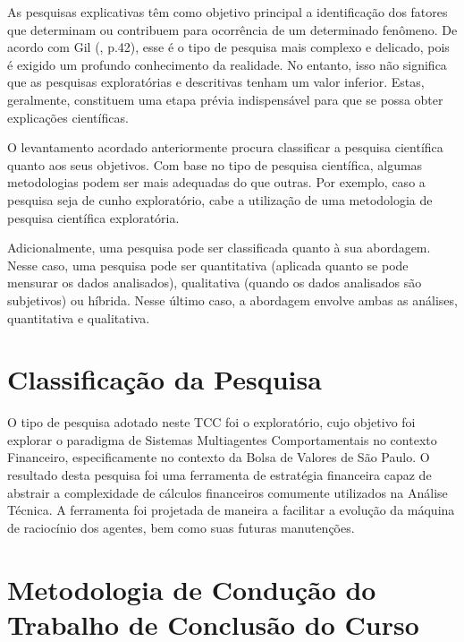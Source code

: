 As pesquisas explicativas têm como objetivo principal a identificação dos fatores que determinam ou contribuem para ocorrência de um determinado fenômeno. De acordo com Gil (\citeyear{gil2002}, p.42), esse é o tipo de pesquisa mais complexo e delicado, pois é exigido um profundo conhecimento da realidade. No entanto, isso não significa que as pesquisas exploratórias e descritivas tenham um valor inferior. Estas, geralmente, constituem uma etapa prévia indispensável para que se possa obter explicações científicas. 

O levantamento acordado anteriormente procura classificar a pesquisa científica quanto aos seus objetivos. Com base no tipo de pesquisa científica, algumas metodologias podem ser mais adequadas do que outras. Por exemplo, caso a pesquisa seja de cunho exploratório, cabe a utilização de uma metodologia de pesquisa científica exploratória. 

Adicionalmente, uma pesquisa pode ser classificada quanto à sua abordagem. Nesse caso, uma pesquisa pode ser quantitativa (aplicada quanto se pode mensurar os dados analisados), qualitativa (quando os dados analisados são subjetivos) ou híbrida. Nesse último caso, a abordagem envolve ambas as análises, quantitativa e qualitativa.

\section{Classificação da Pesquisa }

O tipo de pesquisa adotado neste TCC foi o exploratório, cujo objetivo foi explorar o paradigma de Sistemas Multiagentes Comportamentais no contexto Financeiro, especificamente no contexto da Bolsa de Valores de São Paulo. O resultado desta pesquisa foi uma ferramenta de estratégia financeira capaz de abstrair a complexidade de cálculos financeiros comumente utilizados na Análise Técnica. A ferramenta foi projetada de maneira a facilitar a evolução da máquina de raciocínio dos agentes, bem como suas futuras manutenções. 


\section{Metodologia de Condução do Trabalho de Conclusão do Curso}

